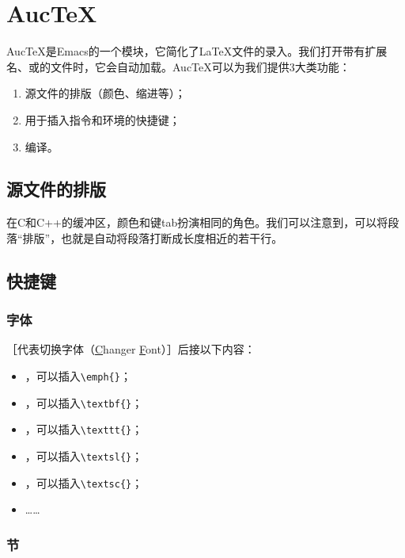 \section{Auc\TeX }

Auc\TeX 是\textsf{Emacs}的一个模块，它简化了\LaTeX 文件的录入。我们打开带有扩展名、或的文件时，它会自动加载。Auc\TeX 可以为我们提供3大类功能：

\begin{enumerate}
    \item 源文件的排版（颜色、缩进等）；
    \item 用于插入指令和环境的快捷键；
    \item 编译。
\end{enumerate}

\subsection{源文件的排版}

在C和C++的缓冲区，颜色和键\textsf{tab}扮演相同的角色。我们可以注意到，可以将段落“排版”，也就是自动将段落打断成长度相近的若干行。

\subsection{快捷键}

\subsubsection{字体}

［代表切换字体（\underline{C}hanger \underline{F}ont）］后接以下内容：

\begin{itemize}
    \item {}，可以插入\verb+\emph{}+；
    \item {}，可以插入\verb+\textbf{}+；
    \item {}，可以插入\verb+\texttt{}+；
    \item {}，可以插入\verb+\textsl{}+；
    \item {}，可以插入\verb+\textsc{}+；
    \item ……
\end{itemize}

\subsubsection{节}

